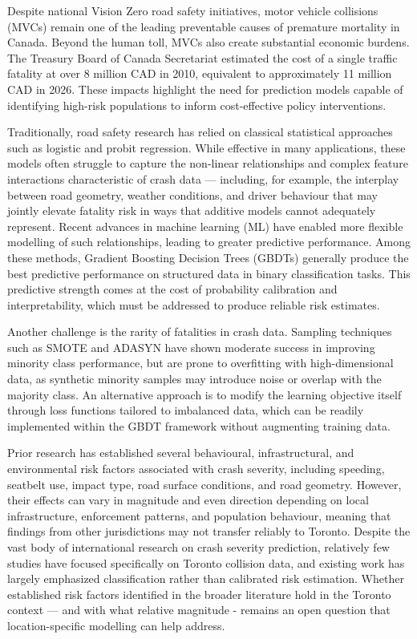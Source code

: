 \documentclass{article}
\begin{document}
Despite national Vision Zero road safety initiatives, motor vehicle collisions (MVCs) remain one of the leading preventable causes of premature mortality in Canada.\cite{Yao2019-ss} Beyond the human toll, MVCs also create substantial economic burdens. The Treasury Board of Canada Secretariat estimated the cost of a single traffic fatality at over 8 million CAD in 2010, equivalent to approximately 11 million CAD in 2026.\cite{transport2020socialcosts} These impacts highlight the need for prediction models capable of identifying high-risk populations to inform cost-effective policy interventions.

Traditionally, road safety research has relied on classical statistical approaches such as logistic and probit regression. While effective in many applications, these models often struggle to capture the non-linear relationships and complex feature interactions characteristic of crash data — including, for example, the interplay between road geometry, weather conditions, and driver behaviour that may jointly elevate fatality risk in ways that additive models cannot adequately represent. Recent advances in machine learning (ML) have enabled more flexible modelling of such relationships, leading to greater predictive performance.\cite{Butt2025-ok} Among these methods, Gradient Boosting Decision Trees (GBDTs) generally produce the best predictive performance on structured data in binary classification tasks.\cite{MLbenchmark, schmitt2022deeplearningvsgradient,Henckaerts2021-vo, Mulugeta2023-or} This predictive strength comes at the cost of probability calibration and interpretability, which must be addressed to produce reliable risk estimates.

Another challenge is the rarity of fatalities in crash data. Sampling techniques such as SMOTE\cite{smote} and ADASYN\cite{adasyn} have shown moderate success in improving minority class performance, but are prone to overfitting with high-dimensional data, as synthetic minority samples may introduce noise or overlap with the majority class.\cite{smote_limit} An alternative approach is to modify the learning objective itself through loss functions tailored to imbalanced data, which can be readily implemented within the GBDT framework without augmenting training data.

Prior research has established several behavioural, infrastructural, and environmental risk factors associated with crash severity, including speeding, seatbelt use, impact type, road surface conditions, and road geometry. However, their effects can vary in magnitude and even direction depending on local infrastructure, enforcement patterns, and population behaviour, meaning that findings from other jurisdictions may not transfer reliably to Toronto.\cite{safety_across_communities} Despite the vast body of international research on crash severity prediction, relatively few studies have focused specifically on Toronto collision data, and existing work has largely emphasized classification rather than calibrated risk estimation. Whether established risk factors identified in the broader literature hold in the Toronto context — and with what relative magnitude - remains an open question that location-specific modelling can help address.\\
\end{document}
